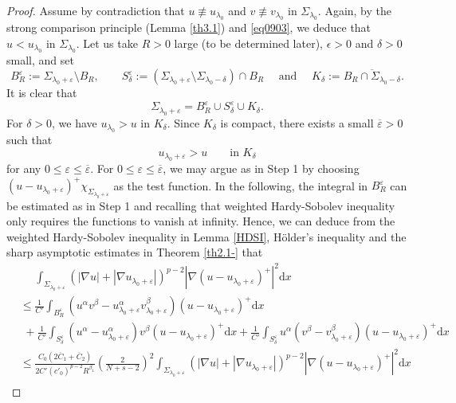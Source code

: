 \documentclass[12pt]{amsart}
\theoremstyle{definition}
\theoremstyle{remark}
\theoremstyle{conclusion}
\theoremstyle{conjecture}
\numberwithin{equation}{section}
\begin{document}
\begin{proof}
Assume by contradiction that $u \not\equiv u_{\lambda_0}$ and $v \not\equiv v_{\lambda_0}$ in $\Sigma_{\lambda_0}$. Again, by the strong comparison principle (Lemma \ref{th3.1}) and \eqref{eq0903}, we deduce that $u<u_{\lambda_0}$ in $\Sigma_{\lambda_0}$. Let us take $R > 0$ large (to be determined later), $\epsilon>0$ and $\delta>0$ small, and set
$$ B^\varepsilon_R:=\Sigma_{\lambda_0 + \varepsilon} \setminus B_R, \quad\quad  S_\delta^\varepsilon:=(\Sigma_{\lambda_0 + \varepsilon} \setminus \Sigma_{\lambda_0 - \delta})\cap B_R  \quad \,\,\mbox{and}\,\,\quad  K_\delta:=\overline{B_R\cap\Sigma_{\lambda_0 - \delta}}.$$
It is clear that
$$ \Sigma_{\lambda_0 + \varepsilon}=B^\varepsilon_R \cup S_\delta^\varepsilon \cup K_\delta.$$
For $\delta>0$, we have $u_{\lambda_0}>u$ in $K_\delta$. Since $K_\delta$ is compact, there exists a small $\overline{\varepsilon}>0$ such that
$$u_{\lambda_0+\varepsilon}>u \,\,\,\,\quad \,\,\mbox{in}\,\,K_\delta$$
for any $0\leq\varepsilon\leq\overline{\varepsilon}$. For $0\leq\varepsilon\leq\overline{\varepsilon}$, we may argue as in Step 1 by choosing $(u-u_{\lambda_0+\varepsilon})^+ \chi_{\Sigma_{\lambda_0+\varepsilon}}$ as the test function. In the following, the integral in $B^\varepsilon_R$ can be estimated as in Step 1 and recalling that weighted Hardy-Sobolev inequality only requires the functions to vanish at infinity. Hence, we can deduce from the weighted Hardy-Sobolev inequality in Lemma \ref{HDSI},  H\"{o}lder's inequality and the sharp asymptotic estimates in Theorem \ref{th2.1-} that
\begin{align}\label{eq1001}
&\quad\,\,\int_{\Sigma_{\lambda_0+\varepsilon}} (|\nabla u|+|\nabla u_{\lambda_0+\varepsilon}|)^{p-2} |\nabla(u-u_{\lambda_0+\varepsilon})^+|^2 \mathrm{d}x \\
&\leq \frac{1}{C'} \int_{B^\varepsilon_R}  (u^\alpha v^\beta- u^\alpha_{\lambda_0 +\varepsilon} v^\beta_{\lambda_0 +\varepsilon} ) (u-u_{\lambda_0+\varepsilon})^+ \mathrm{d}x\nonumber\\
&\,\,+ \frac{1}{C'} \int_{S^\varepsilon_\delta} (u^\alpha-u^\alpha_{\lambda_0+\varepsilon}) v^\beta (u-u_{\lambda_0+\varepsilon})^+ \mathrm{d}x + \frac{1}{C'} \int_{S^\varepsilon_\delta} u^\alpha(v^\beta-v^\beta_{\lambda_0+\varepsilon}) (u-u_{\lambda_0+\varepsilon})^+ \mathrm{d}x \nonumber \\
&\leq \frac{C_0(2\overline{C}_1+\overline{C}_2)}{2C'(c'_0)^{p-2}R^{\beta_1}} \left( \frac{2}{N+s-2} \right)^2 \int_{\Sigma_{\lambda_0 + \varepsilon}}\left(|\nabla u| +|\nabla u_{\lambda_0+\varepsilon}|\right)^{p-2} |\nabla(u-u_{\lambda_0+\varepsilon})^+|^2 \mathrm{d}x \nonumber\\

\end{align}
\end{proof}
\end{document}
